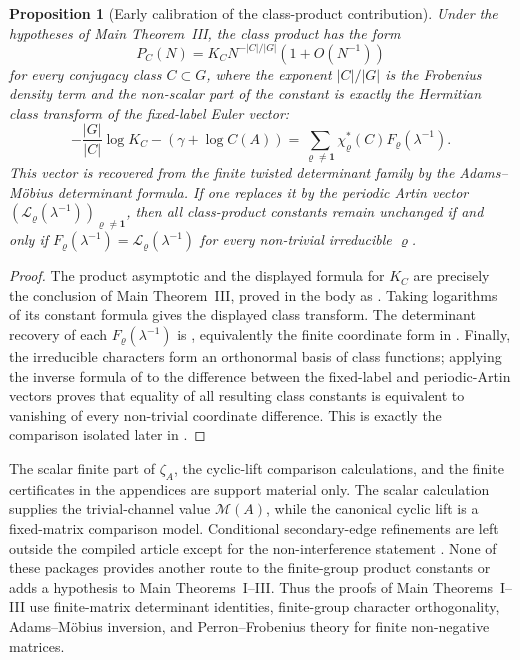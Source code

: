 \documentclass[11pt,a4paper]{amsart}
\theoremstyle{plain}
\newtheorem{proposition}[theorem]{Proposition}
\theoremstyle{definition}
\theoremstyle{remark}
\begin{document}
\begin{proposition}[Early calibration of the class-product contribution]
  \label{prop:intro-class-product-calibration}
  Under the hypotheses of Main Theorem~III, the class product has the form
  \[
    P_C(N)=K_C N^{-|C|/|G|}(1+O(N^{-1}))
  \]
  for every conjugacy class \(C\subset G\), where the exponent
  \(|C|/|G|\) is the Frobenius density term and the non-scalar part of the
  constant is exactly the Hermitian class transform of the fixed-label Euler
  vector:
  \[
    -\frac{|G|}{|C|}\log K_C-(\gamma+
    \log C(A))
    =
    \sum_{\varrho\ne\mathbf1}
      \chi_\varrho^\ast(C)F_\varrho(\lambda^{-1}).
  \]
  This vector is recovered from the finite twisted determinant family by the
  Adams--M\"obius determinant formula.  If one replaces it by the periodic
  Artin vector
  \((\mathcal L_\varrho(\lambda^{-1}))_{\varrho\ne\mathbf1}\), then all
  class-product constants remain unchanged if and only if
  \(F_\varrho(\lambda^{-1})=
  \mathcal L_\varrho(\lambda^{-1})\) for every non-trivial irreducible
  \(\varrho\).
\end{proposition}
\begin{proof}
  The product asymptotic and the displayed formula for \(K_C\) are precisely
  the conclusion of Main Theorem~III, proved in the body as
  .  Taking logarithms of its constant
  formula gives the displayed class transform.  The determinant recovery of
  each \(F_\varrho(\lambda^{-1})\) is
  , equivalently the finite
  coordinate form in .  Finally,
  the irreducible characters form an orthonormal basis of class functions;
  applying the inverse formula of
   to the difference
  between the fixed-label and periodic-Artin vectors proves that equality of
  all resulting class constants is equivalent to vanishing of every
  non-trivial coordinate difference.  This is exactly the comparison isolated
  later in .
\end{proof}

The scalar finite part of \(\zeta_A\), the cyclic-lift comparison
calculations, and the finite certificates in the appendices are support
material only.  The scalar calculation supplies the trivial-channel value
\(\mathcal M(A)\), while the canonical cyclic lift is a fixed-matrix
comparison model.  Conditional secondary-edge refinements are left outside the
compiled article except for the non-interference statement
.  None of these packages
provides another route to the finite-group product constants or adds a
hypothesis to Main Theorems~I--III.  Thus the proofs of Main
Theorems~I--III use finite-matrix determinant identities, finite-group
character orthogonality, Adams--M\"obius inversion, and Perron--Frobenius
theory for finite non-negative matrices.
\end{document}
